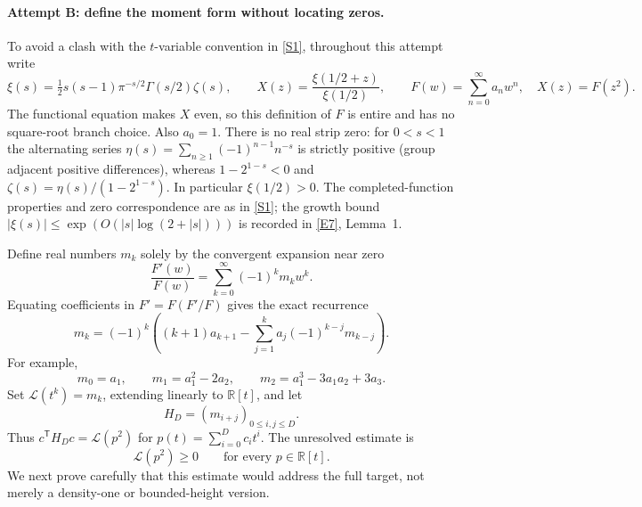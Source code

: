 \documentclass[11pt]{article}
\newcommand{\R}{\mathbb{R}}
\newcommand{\sref}[2]{\hyperlink{source:#1:#2}{[S#2]}}
\newcommand{\eref}[2]{\hyperlink{extra:#1:#2}{[E#2]}}
\begin{document}
\paragraph{Attempt B: define the moment form without locating zeros.}
To avoid a clash with the $t$-variable convention in \sref{statement}{1}, throughout
this attempt write
\[
 \xi(s)=\tfrac12s(s-1)\pi^{-s/2}\Gamma(s/2)\zeta(s),\qquad
 X(z)=\frac{\xi(1/2+z)}{\xi(1/2)},\qquad
 F(w)=\sum_{n=0}^{\infty}a_nw^n,\quad X(z)=F(z^2).
\]
The functional equation makes $X$ even, so this definition of $F$ is entire
and has no square-root branch choice. Also $a_0=1$. There is no real strip zero:
for $0<s<1$ the alternating series
$\eta(s)=\sum_{n\ge1}(-1)^{n-1}n^{-s}$ is strictly positive (group adjacent
positive differences), whereas $1-2^{1-s}<0$ and
$\zeta(s)=\eta(s)/(1-2^{1-s})$. In particular $\xi(1/2)>0$.
The completed-function properties and zero correspondence are as in
\sref{statement}{1}; the growth bound
$|\xi(s)|\le\exp(O(|s|\log(2+|s|)))$ is recorded in
\eref{statement}{7}, Lemma~1.

Define real numbers $m_k$ solely by the convergent expansion near zero
\begin{equation}\label{ra:statement:moment-definition}
 \frac{F'(w)}{F(w)}=\sum_{k=0}^{\infty}(-1)^km_kw^k.
\end{equation}
Equating coefficients in $F'=F(F'/F)$ gives the exact recurrence
\begin{equation}\label{ra:statement:recurrence}
 m_k=(-1)^k\left((k+1)a_{k+1}
       -\sum_{j=1}^{k}a_j(-1)^{k-j}m_{k-j}\right).
\end{equation}
For example,
\[
 m_0=a_1,\qquad m_1=a_1^2-2a_2,\qquad
 m_2=a_1^3-3a_1a_2+3a_3.
\]
Set $\mathcal L(t^k)=m_k$, extending linearly to $\R[t]$, and let
\begin{equation}\label{ra:statement:hankel}
 H_D=(m_{i+j})_{0\le i,j\le D}.
\end{equation}
Thus $c^{\mathsf T}H_Dc=\mathcal L(p^2)$ for
$p(t)=\sum_{i=0}^D c_it^i$. The unresolved estimate is
\begin{equation}\label{ra:statement:missing-positivity}
 \mathcal L(p^2)\ge0\qquad\text{for every }p\in\R[t].
\end{equation}
We next prove carefully that this estimate would address the full target,
not merely a density-one or bounded-height version.
\end{document}
